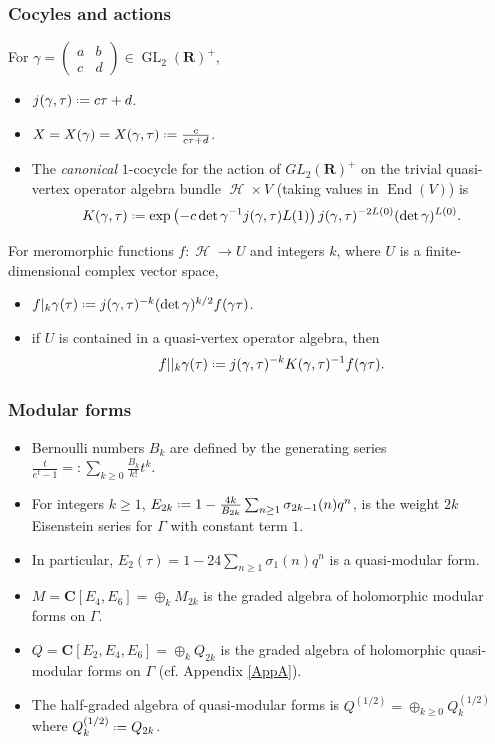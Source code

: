 \documentclass[12pt]{amsart}
\theoremstyle{plain}
\theoremstyle{definition}
\theoremstyle{remark}
\DeclareMathOperator{\uhp}{\mathcal{H}}
\DeclareMathOperator{\Endo}{End}
\DeclareMathOperator{\GL}{GL}
\newcommand*{\df}{\mathrel{\vcenter{\baselineskip0.5ex \lineskiplimit0pt
                     \hbox{\scriptsize.}\hbox{\scriptsize.}}} =}
\providecommand{\stwomat}[4]{\left(\begin{smallmatrix}#1&#2\\#3&#4\end{smallmatrix}\right)}
\newcommand{\CC}{\mathbf{C}}
\newcommand{\RR}{\mathbf{R}}
\begin{document}
\subsubsection{Cocyles and actions}
For $\gamma=\stwomat {a}{b}{c}{d} \in \GL_2(\RR)^+$,
\begin{itemize}
    \item[---] $j(\gamma, \tau)\df c\tau+d$.
    \item[---] $X=X(\gamma)=X(\gamma, \tau)\df\frac{c}{c\tau+d}$.
    \item[---] The \emph{canonical} $1$-cocycle for the action of $GL_2(\RR)^+$ on the trivial quasi-vertex operator algebra bundle $\uhp\times V$ (taking values in $\Endo(V)$) is
\[ K(\gamma,\tau)\df\exp\left(-c\det\gamma^{-1} j(\gamma,\tau)L(1)\right)j(\gamma,\tau)^{-2L(0)}(\det\gamma)^{L(0)}.\]
\end{itemize}
For meromorphic functions $f:\uhp \rightarrow U$ and integers $k$, where $U$ is a finite-dimensional complex vector space,
\begin{itemize}
    \item[---] $f|_k\gamma(\tau)\df j(\gamma, \tau)^{-k}(\det\gamma)^{k/2}f(\gamma\tau)$.
\item[---] if $U$ is contained in a quasi-vertex operator algebra, then \[f||_k \gamma(\tau)\df j(\gamma, \tau)^{-k}K(\gamma, \tau)^{-1}f(\gamma\tau).\]
\end{itemize}
\subsubsection{Modular forms}
\begin{itemize}
\item[---] Bernoulli numbers $B_k$ are defined by the generating series
$\tfrac{t}{e^t-1}=:\sum_{k\geq0} \tfrac{B_k}{k!}t^k.$
    \item[---] For integers $k\geq 1$, $E_{2k}\df  1-\frac{4k}{B_{2k}}\sum_{n\geq1} \sigma_{2k-1}(n)q^n$, is the weight $2k$ Eisenstein series for $\Gamma$ with constant term $1$.
    \item[---] In particular,
$E_2(\tau) = 1-24\sum_{n\geq1} \sigma_1(n)q^n$ is a quasi-modular form.
\item[---] $M=\CC[E_4, E_6]=\oplus_k M_{2k}$ is the graded algebra of holomorphic modular forms on $\Gamma$.
\item[---] $Q=\CC[E_2, E_4, E_6]=\oplus_k Q_{2k}$ is the graded algebra of holomorphic quasi-modular forms on $\Gamma$ (cf. Appendix \ref{AppA}).
\item[---] The half-graded algebra of quasi-modular forms is $Q^{(1/2)} = \oplus_{k\geq0} Q^{(1/2)}_k$ where $Q^{(1/2)}_k\df Q_{2k}$.
\end{itemize}
\end{document}

